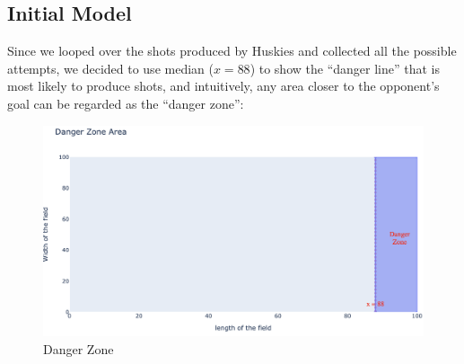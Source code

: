 \documentclass[12pt]{article}
\begin{document}
\subsection{Initial Model}
Since we looped over the shots produced by Huskies and collected all the possible attempts, we decided to use median ($x=88$) to show the “danger line” that is most likely to produce shots, and intuitively, any area closer to the opponent’s goal can be regarded as the “danger zone”:
\begin{figure}[ht]
\begin{center}
\includegraphics[scale=0.6]{images/DangerZone.png}
\caption{Danger Zone}
\end{center}
\end{figure}
\end{document}
